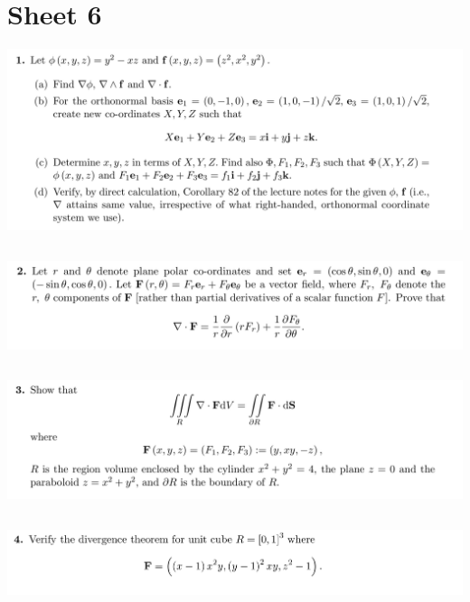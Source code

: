 \documentclass[12pt]{article}
\begin{document}
\newpage
\section{Sheet 6}
\begin{mdframed}
\includegraphics[width=400pt]{img/oxford-prelims-M5-multivariable-calc-6-1.png}
\end{mdframed}

\subsection{}
\begin{mdframed}
\includegraphics[width=400pt]{img/oxford-prelims-M5-multivariable-calc-6-2.png}
\end{mdframed}

\subsection{}
\begin{mdframed}
\includegraphics[width=400pt]{img/oxford-prelims-M5-multivariable-calc-6-3.png}
\end{mdframed}

\subsection{}
\begin{mdframed}
\includegraphics[width=400pt]{img/oxford-prelims-M5-multivariable-calc-6-4.png}
\end{mdframed}
\end{document}
